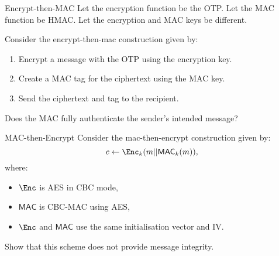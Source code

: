 \documentclass{practice}
\newcommand*{\MAC}{\mathsf{MAC}}
\begin{document}
\begin{task}{Encrypt-then-MAC}
  Let the encryption function be the OTP.
  Let the MAC function be HMAC.
  Let the encryption and MAC keys be different.

  Consider the encrypt-then-mac construction given by:
  \begin{enumerate}
    \item Encrypt a message with the OTP using the encryption key.
    \item Create a MAC tag for the ciphertext using the MAC key.
    \item Send the ciphertext and tag to the recipient.
  \end{enumerate}

  Does the MAC fully authenticate the sender's intended message?
\end{task}

\begin{task}{MAC-then-Encrypt}
  Consider the mac-then-encrypt construction given by:
  \[
    c \gets \Enc_k(m||\MAC_k(m)),
  \]
  where:
  \begin{itemize}
    \item $\Enc$ is AES in CBC mode,
    \item $\MAC$ is CBC-MAC using AES,
    \item $\Enc$ and $\MAC$ use the same initialisation vector and IV.
  \end{itemize}

  Show that this scheme does not provide message integrity.
\end{task}
\end{document}
